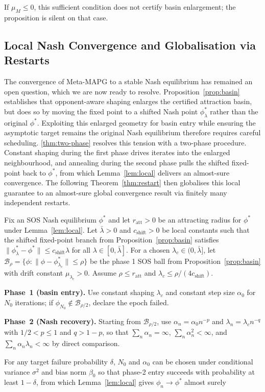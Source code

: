 \documentclass{nextgame2026} %
\newcommand{\B}{\mathcal{B}}
\begin{document}
If $\mu_M \leq 0$, this sufficient condition does not certify basin enlargement; the proposition is silent on that case.


\subsection{Local Nash Convergence and Globalisation via Restarts}

The convergence of Meta-MAPG to a stable Nash equilibrium has remained an open question, which we are now ready to resolve. Proposition~\ref{prop:basin} establishes that opponent-aware shaping enlarges the certified attraction basin, but does so by moving the fixed point to a shifted Nash point $\phi^*_\lambda$ rather than the original $\phi^*$. Exploiting this enlarged geometry for basin entry while ensuring the asymptotic target remains the original Nash equilibrium therefore requires careful scheduling. \cref{thm:two-phase} resolves this tension with a two-phase procedure. Constant shaping during the first phase drives iterates into the enlarged neighbourhood, and annealing during the second phase pulls the shifted fixed-point back to $\phi^*$, from which Lemma~\ref{lem:local} delivers an almost-sure convergence. The following Theorem~\ref{thm:restart} then globalises this local guarantee to an almost-sure global convergence result via finitely many independent restarts.

\begin{theorem}\label{thm:two-phase}
Fix an SOS Nash equilibrium $\phi^*$ and let $r_{\mathrm{att}} > 0$ be an 
attracting radius for $\phi^*$ under Lemma~\ref{lem:local}. Let 
$\bar\lambda > 0$ and $c_{\mathrm{shift}} > 0$ be local constants such 
that the shifted fixed-point branch from Proposition~\ref{prop:basin} 
satisfies $\|\phi^*_\lambda - \phi^*\| \le c_{\mathrm{shift}} \lambda$ for 
all $\lambda \in [0, \bar\lambda]$. For a chosen $\lambda_c \in (0,\bar\lambda]$, 
let $\B_\rho = \{\phi : \|\phi - \phi^*_{\lambda_c}\| \le \rho\}$ be the 
phase 1 SOS ball from Proposition~\ref{prop:basin} with drift constant 
$\mu_{\lambda_c} > 0$. Assume $\rho \le r_{\mathrm{att}}$ and 
$\lambda_c \le \rho/(4c_{\mathrm{shift}})$.

\textbf{Phase~1 (basin entry).} Use constant shaping $\lambda_c$ and 
constant step size $\alpha_0$ for $N_0$ iterations; if 
$\phi_{N_0} \notin \B_{\rho/2}$, declare the epoch failed.


\textbf{Phase~2 (Nash recovery).} Starting from $\B_{\rho/2}$, use 
$\alpha_n = \alpha_0 n^{-p}$ and $\lambda_n = \lambda_c n^{-q}$ with 
$1/2 < p \le 1$ and $q > 1-p$, so that $\sum_n \alpha_n = \infty$, 
$\sum_n \alpha_n^2 < \infty$, and $\sum_n \alpha_n \lambda_n < \infty$ 
by direct comparison.

For any target failure probability $\delta$, $N_0$ and $\alpha_0$ can be 
chosen under conditional variance $\sigma^2$ and bias norm $\beta_0$ so 
that phase-2 entry succeeds with probability at least $1 - \delta$, from 
which Lemma~\ref{lem:local} gives $\phi_n \to \phi^*$ almost surely

\end{theorem}
\end{document}
